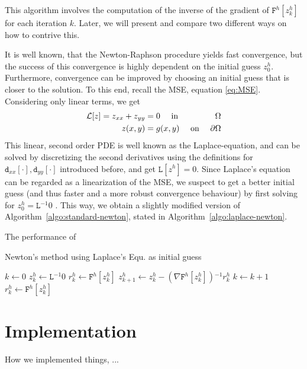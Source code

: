\documentclass[11pt]{scrartcl}
\newcommand{\mSurfDisc}[1]{\ensuremath{\mathtt{F}^h\left[#1\right]}}
\newcommand{\Dxx}[1]{\ensuremath{\mathtt{d}_{xx}[#1]}}
\newcommand{\Dyy}[1]{\ensuremath{\mathtt{d}_{yy}[#1]}}
\newcommand{\inv}{\ensuremath{^{-1}}}
\begin{document}
This algorithm involves the computation of the inverse of the gradient of $\mSurfDisc{z^h_k}$ for each iteration $k$. Later, we will present and compare two different ways on how to contrive this.

It is well known, that the Newton-Raphson procedure yields fast convergence, but the success of this convergence is highly dependent on the initial guess $z^h_0$. Furthermore, convergence can be improved by choosing an initial guess that is closer to the solution. 
To this end, recall the MSE, equation \eqref{eq:MSE}. Considering only linear terms, we get 
\begin{align}
	\mathcal{L} [z] = z_{xx} + z_{yy} &= 0 \quad \text{ in }& \Omega \\
	z(x,y) &= g(x,y) \quad \text{ on }& \partial\Omega \notag 
\end{align}
This linear, second order PDE is well known as the Laplace-equation, and can be solved by discretizing the second derivatives using the definitions for $\Dxx{\cdot},\Dyy{\cdot}$ introduced before, and get $\mathtt{L}[z^h]=0 $. Since Laplace's equation can be regarded as a linearization of the MSE, we suspect to get a better initial guess (and thus faster and a more robust convergence behaviour) by first solving for $z^h_0= \mathtt{L}\inv 0$ . This way, we obtain a slightly modified version of Algorithm~\ref{algo:standard-newton}, stated in Algorithm~\ref{algo:laplace-newton}.

The performance of 
\begin{algorithm}
	\caption{Newton's method using Laplace's Equ. as initial guess}\label{algo:laplace-newton}
	\begin{algorithmic}
		\State $k \gets 0$ 
		\State $z^h_k \gets \mathtt{L}\inv 0 $ 
		\State $r^h_k \gets \mSurfDisc{z^h_k}$
		\State $z^h_{k+1} \gets z^h_{k} - \left(\nabla\mSurfDisc{z^h_k}\right)\inv r^h_k $
		\State $k \gets k+1$ 
		\State $r^h_k \gets \mSurfDisc{z^h_k}$
		\EndWhile
	\end{algorithmic}
\end{algorithm}

\section{Implementation}

How we implemented things, ...
\end{document}
